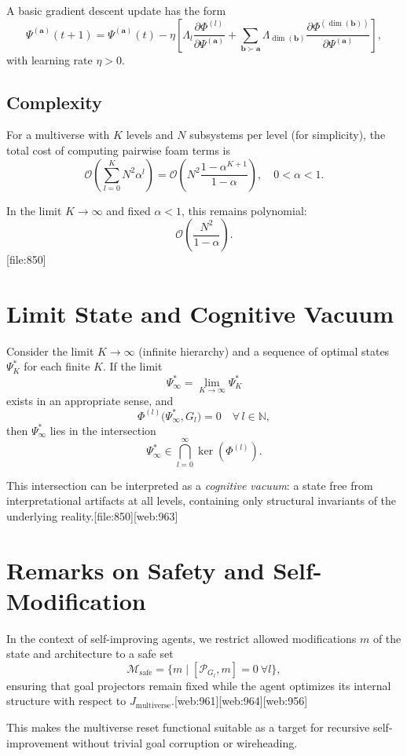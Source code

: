 \documentclass[12pt]{article}
\begin{document}
A basic gradient descent update has the form
\[
\Psi^{(\bm{a})}(t+1) =
\Psi^{(\bm{a})}(t)
-
\eta
\left[
\Lambda_l
\frac{\partial \Phi^{(l)}}{\partial \Psi^{(\bm{a})}}
+
\sum_{\bm{b} \succ \bm{a}}
\Lambda_{\dim(\bm{b})}
\frac{\partial \Phi^{(\dim(\bm{b}))}}{\partial \Psi^{(\bm{a})}}
\right],
\]
with learning rate $\eta > 0$.

\subsection{Complexity}

For a multiverse with $K$ levels and $N$ subsystems per level (for simplicity),
the total cost of computing pairwise foam terms is
\[
\mathcal{O}\left(
  \sum_{l=0}^K N^2 \alpha^l
\right)
=
\mathcal{O}\left(
  N^2 \frac{1 - \alpha^{K+1}}{1 - \alpha}
\right),
\quad 0 < \alpha < 1.
\]

In the limit $K \to \infty$ and fixed $\alpha < 1$, this remains polynomial:
\[
\mathcal{O}\left(
  \frac{N^2}{1-\alpha}
\right).
\][file:850]

\section{Limit State and Cognitive Vacuum}

Consider the limit $K \to \infty$ (infinite hierarchy) and a sequence of optimal
states $\Psi_K^*$ for each finite $K$. If the limit
\[
\Psi_\infty^* = \lim_{K \to \infty} \Psi_K^*
\]
exists in an appropriate sense, and
\[
\Phi^{(l)}\big(\Psi_\infty^*, G_l\big) = 0
\quad \forall\, l \in \mathbb{N},
\]
then $\Psi_\infty^*$ lies in the intersection
\[
\Psi_\infty^* \in \bigcap_{l=0}^\infty \ker(\Phi^{(l)}).
\]

This intersection can be interpreted as a \emph{cognitive vacuum}:
a state free from interpretational artifacts at all levels, containing
only structural invariants of the underlying reality.[file:850][web:963]

\section{Remarks on Safety and Self-Modification}

In the context of self-improving agents, we restrict allowed
modifications $m$ of the state and architecture to a safe set
\[
\mathcal{M}_{\text{safe}} =
\{ m \mid [\mathcal{P}_{G_l}, m] = 0 \ \forall l \},
\]
ensuring that goal projectors remain fixed while the agent optimizes
its internal structure with respect to $J_{\text{multiverse}}$.[web:961][web:964][web:956]

This makes the multiverse reset functional suitable as a target for
recursive self-improvement without trivial goal corruption or wireheading.
\end{document}
